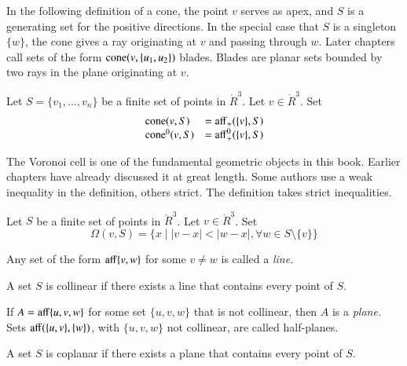 In the following definition of a cone, the point $v$ serves
as apex, and $S$ is a generating set for the positive directions.
In the special case that $S$ is a singleton $\{w\}$, 
the cone gives
a ray originating at $v$ and passing through $w$.  Later
chapters call sets of the form ${\operatorname{cone}}(v,\{u_1,u_2\})$ blades.
Blades are planar sets bounded by two rays
in the plane originating at $v$.

\begin{definition}[cone]
Let $S=\{v_1,\ldots,v_n\}$ be a finite set of points in 
$\ring{R}^3$.  Let $v\in\ring{R}^3$. Set
  $$\begin{array}{lll}
  {\operatorname{cone}}(v,S) &= {\operatorname{aff}}_+(\{v\},S)\\
  {\operatorname{cone}}^0(v,S) &= {\operatorname{aff}}^0_+(\{v\},S)\\
  \end{array}
  $$
\end{definition}

The Voronoi cell is one of the fundamental geometric objects
in this book.  Earlier chapters have already discussed it
at great length.  Some authors use a weak inequality in
the definition, others strict.
The definition takes strict inequalities.


\begin{definition} 
Let $S$ be a finite set of points in 
$\ring{R}^3$.  Let $v\in\ring{R}^3$. Set
  $$
  \Omega(v,S) = \{x \mid |v-x| < |w-x|, \forall w\in S\setminus\{v\}\}
  $$
\end{definition}
	
\begin{definition}[line]	
Any set of the form ${\operatorname{aff}}\{v,w\}$ for some $v\ne w$ is called a 
 {\it line.}
\end{definition}

\begin{definition}[collinear]  A set $S$ is collinear if there exists
a line that contains every point of $S$.
\end{definition}

\begin{definition}	
If $A={\operatorname{aff}}\{u,v,w\}$ for some set $\{u,v,w\}$ that is not collinear,
then $A$ is a {\it plane.}  Sets ${\operatorname{aff}}(\{u,v\},\{w\})$, with
$\{u,v,w\}$ not collinear, are called half-planes.
\end{definition}

\begin{definition}[coplanar] A set $S$ is  coplanar if there exists
a plane that contains every point of $S$.
\end{definition}

